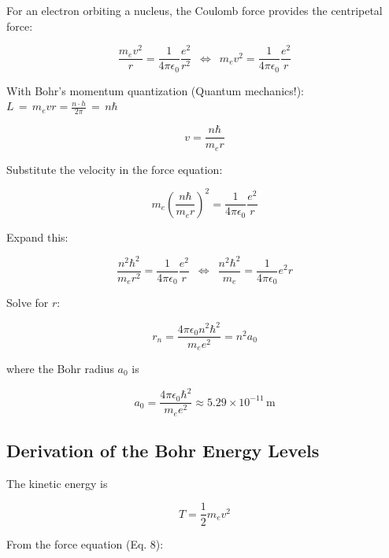 \documentclass[
	a4paper,
	parskip=half,
    pagesize=auto,      		%
    listof=totoc,   		%
    bibliography=totoc,
	11pt
]{scrartcl}
\begin{document}
For an electron orbiting a nucleus, the Coulomb force provides the centripetal force:

\begin{equation}
	\frac{m_e v^2}{r} = \frac{1}{4\pi\epsilon_0}\frac{e^2}{r^2} \,\,\, \Leftrightarrow \,\,\, m_e v^2 = \frac{1}{4\pi\epsilon_0}\frac{e^2}{r}
\end{equation}


With Bohr's momentum quantization (Quantum mechanics!): $L \, = \, m_e v r = \frac{n \cdot h}{2 \pi} \, = \, n \hbar$


\begin{equation}
	v = \frac{n\hbar}{m_e r}
\end{equation}

Substitute the velocity in the force equation:

\begin{equation}
	m_e \left(\frac{n\hbar}{m_e r}\right)^2
	=
	\frac{1}{4\pi\epsilon_0}\frac{e^2}{r}
\end{equation}

Expand this:

\begin{equation}
	\frac{n^2 \hbar^2}{m_e r^2}
	=
	\frac{1}{4\pi\epsilon_0}\frac{e^2}{r} \,\,\, \Leftrightarrow \,\,\, \frac{n^2 \hbar^2}{m_e}
	=
	\frac{1}{4\pi\epsilon_0} e^2 r
\end{equation}

Solve for $r$:

\begin{equation}
	r_n =
	\frac{4\pi\epsilon_0 n^2 \hbar^2}{m_e e^2} = n^2 a_0
\end{equation}

where the Bohr radius $a_0$ is

\begin{equation}
	a_0 =
	\frac{4\pi\epsilon_0 \hbar^2}{m_e e^2}
	\approx 5.29 \times 10^{-11}\,\mathrm{m}
\end{equation}


\subsection{Derivation of the Bohr Energy Levels}

The kinetic energy is

\begin{equation}
	T = \frac{1}{2}m_e v^2
\end{equation}

From the force equation (Eq. 8):
\end{document}
